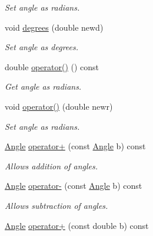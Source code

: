 \begin{DoxyCompactItemize}
\begin{DoxyCompactList}\small\item\em Set angle as radians. \end{DoxyCompactList}\item 
\hypertarget{class_angle_a95a0e93561ed16f09dec31709184dc2d}{void \hyperlink{class_angle_a95a0e93561ed16f09dec31709184dc2d}{degrees} (double newd)}\label{class_angle_a95a0e93561ed16f09dec31709184dc2d}

\begin{DoxyCompactList}\small\item\em Set angle as degrees. \end{DoxyCompactList}\item 
\hypertarget{class_angle_af3d3d25f5b5ed54354ce4a865f02afed}{double \hyperlink{class_angle_af3d3d25f5b5ed54354ce4a865f02afed}{operator()} () const }\label{class_angle_af3d3d25f5b5ed54354ce4a865f02afed}

\begin{DoxyCompactList}\small\item\em Get angle as radians. \end{DoxyCompactList}\item 
\hypertarget{class_angle_ae619ecbedfd74d52441ebea70d3d58bd}{void \hyperlink{class_angle_ae619ecbedfd74d52441ebea70d3d58bd}{operator()} (double newr)}\label{class_angle_ae619ecbedfd74d52441ebea70d3d58bd}

\begin{DoxyCompactList}\small\item\em Set angle as radians. \end{DoxyCompactList}\item 
\hypertarget{class_angle_a78e6da07fdafa807031e218346adeb44}{\hyperlink{class_angle}{Angle} \hyperlink{class_angle_a78e6da07fdafa807031e218346adeb44}{operator+} (const \hyperlink{class_angle}{Angle} b) const }\label{class_angle_a78e6da07fdafa807031e218346adeb44}

\begin{DoxyCompactList}\small\item\em Allows addition of angles. \end{DoxyCompactList}\item 
\hypertarget{class_angle_a230bffed1b4711cc20388d76a2220489}{\hyperlink{class_angle}{Angle} \hyperlink{class_angle_a230bffed1b4711cc20388d76a2220489}{operator-\/} (const \hyperlink{class_angle}{Angle} b) const }\label{class_angle_a230bffed1b4711cc20388d76a2220489}

\begin{DoxyCompactList}\small\item\em Allows subtraction of angles. \end{DoxyCompactList}\item 
\hypertarget{class_angle_ad0ea64ba459b518a4994e4824736ca44}{\hyperlink{class_angle}{Angle} \hyperlink{class_angle_ad0ea64ba459b518a4994e4824736ca44}{operator+} (const double b) const }\label{class_angle_ad0ea64ba459b518a4994e4824736ca44}


\end{DoxyCompactItemize}
